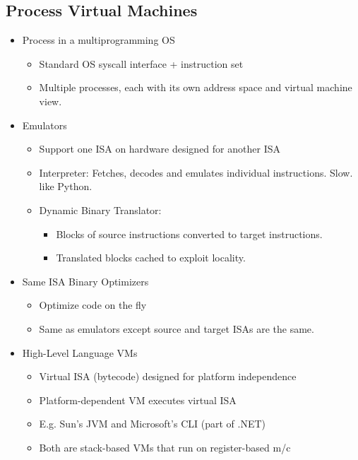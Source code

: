 \documentclass[12pt]{article}
\begin{document}
\subsection{Process Virtual Machines}
\begin{itemize}
    \item Process in a multiprogramming OS \begin{itemize}
        \item Standard OS syscall interface + instruction set
        \item Multiple processes, each with its own address space and virtual machine view.
    \end{itemize}
    \item Emulators \begin{itemize}
        \item Support one ISA on hardware designed for another ISA
        \item Interpreter: Fetches, decodes and emulates individual instructions. Slow. like Python.
        \item Dynamic Binary Translator: \begin{itemize}
            \item Blocks of source instructions converted to target instructions.
            \item Translated blocks cached to exploit locality.
        \end{itemize}
    \end{itemize}
    \item Same ISA Binary Optimizers \begin{itemize}
        \item Optimize code on the fly
        \item Same as emulators except source and target ISAs are the same.
    \end{itemize}
    \item High-Level Language VMs \begin{itemize}
        \item Virtual ISA (bytecode) designed for platform independence
        \item Platform-dependent VM executes virtual ISA
        \item E.g. Sun’s JVM and Microsoft’s CLI (part of .NET)
        \item Both are stack-based VMs that run on register-based m/c
    \end{itemize}
\end{itemize}
\end{document}
